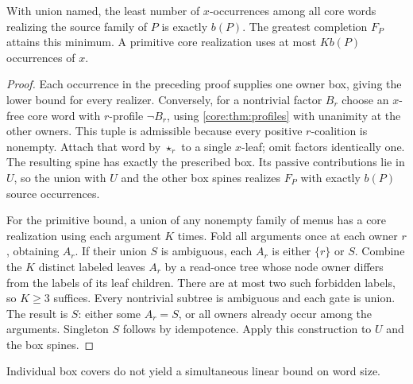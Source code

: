 \begin{corollary}\label{core:cor:source-box-rank}
With union named, the least number of $x$-occurrences among all core
words realizing the source family of $P$ is exactly $b(P)$.
The greatest completion $F_P$ attains this minimum. A primitive core
realization uses at most $K b(P)$ occurrences of $x$.
\end{corollary}
\begin{proof}
Each occurrence in the preceding proof supplies one owner box, giving
the lower bound for every realizer. Conversely, for a nontrivial factor
$B_r$ choose an $x$-free core word with $r$-profile $\neg B_r$, using
\cref{core:thm:profiles} with unanimity at the other owners. This tuple
is admissible because every positive $r$-coalition is nonempty. Attach
that word by $\star_r$ to a single $x$-leaf; omit factors identically
one. The resulting spine has exactly the prescribed box. Its passive
contributions lie in $U$, so the union with $U$ and the other box spines
realizes $F_P$ with exactly $b(P)$ source occurrences.

For the primitive bound, a union of any nonempty family of menus has a
core realization using each argument $K$ times. Fold all arguments once
at each owner $r$, obtaining $A_r$. If their union $S$ is ambiguous,
each $A_r$ is either $\{r\}$ or $S$. Combine the $K$ distinct labeled
leaves $A_r$ by a read-once tree whose node owner differs from the labels
of its leaf children. There are at most two such forbidden labels, so
$K\geq3$ suffices. Every nontrivial subtree is ambiguous and each gate
is union. The result is $S$: either some $A_r=S$, or all owners already
occur among the arguments. Singleton $S$ follows by idempotence.
Apply this construction to $U$ and the box spines.
\end{proof}

Individual box covers do not yield a simultaneous linear bound on word size.

